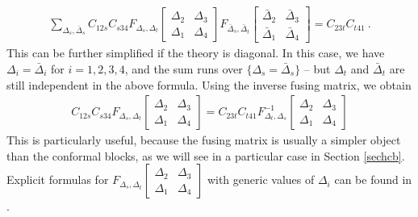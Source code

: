 \documentclass[12pt,a4paper,notitlepage]{report}
\numberwithin{equation}{section}
\theoremstyle{break}
\begin{document}
\begin{align}
 \sum_{\Delta_s,\bar{\Delta}_s} C_{12s} C_{s34}
F_{\Delta_s,\Delta_t}\begin{bmatrix} \Delta_2 & \Delta_3 \\ \Delta_1 & \Delta_4 \end{bmatrix}
F_{\bar{\Delta}_s,\bar{\Delta}_t}\begin{bmatrix} \bar{\Delta}_2 & \bar{\Delta}_3 \\ \bar{\Delta}_1 & \bar{\Delta}_4 \end{bmatrix}
=  C_{23t}C_{t41}\ .
\end{align}
This can be further simplified if the theory is diagonal. In this case, we have $\Delta_i=\bar{\Delta}_i$ for $i=1,2,3,4$, and the sum runs over $\{\Delta_s=\bar{\Delta}_s\}$ -- but $\Delta_t$ and $\bar{\Delta}_t$ are still independent in the above formula. Using the inverse fusing matrix, we obtain 
\begin{align}
 C_{12s} C_{s34}
F_{\Delta_s,\Delta_t}\begin{bmatrix} \Delta_2 & \Delta_3 \\ \Delta_1 & \Delta_4 \end{bmatrix}
= C_{23t}C_{t41} 
F^{-1}_{\Delta_t,\Delta_s}\begin{bmatrix} \Delta_2 & \Delta_3 \\ \Delta_1 & \Delta_4 \end{bmatrix}
\end{align}
This is particularly useful, because the fusing matrix is usually a simpler object than the conformal blocks, as we will see in a particular case in Section \ref{sechcb}. Explicit formulas for $F_{\Delta_s,\Delta_t}\begin{bmatrix} \Delta_2 & \Delta_3 \\ \Delta_1 & \Delta_4 \end{bmatrix}$ with generic values of $\Delta_i$ can be found in \cite{tv12}.
\end{document}

